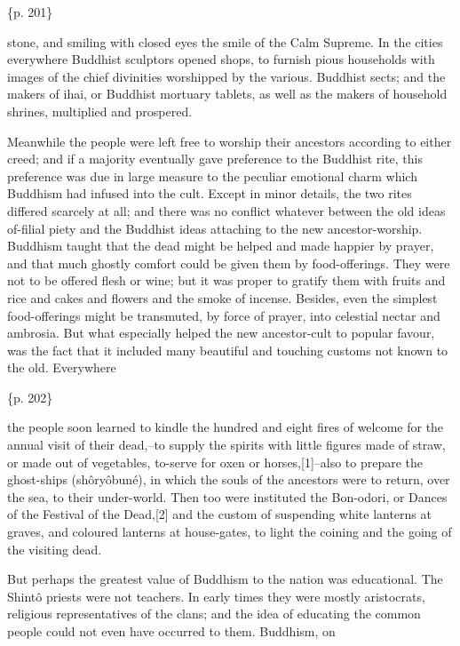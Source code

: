 \{p. 201\}

stone, and smiling with closed eyes the smile of the Calm Supreme. In the cities everywhere Buddhist sculptors opened shops, to furnish pious households with images of the chief divinities worshipped by the various. Buddhist sects; and the makers of ihai, or Buddhist mortuary tablets, as well as the makers of household shrines, multiplied and prospered.



Meanwhile the people were left free to worship their ancestors according to either creed; and if a majority eventually gave preference to the Buddhist rite, this preference was due in large measure to the peculiar emotional charm which Buddhism had infused into the cult. Except in minor details, the two rites differed scarcely at all; and there was no conflict whatever between the old ideas of-filial piety and the Buddhist ideas attaching to the new ancestor-worship. Buddhism taught that the dead might be helped and made happier by prayer, and that much ghostly comfort could be given them by food-offerings. They were not to be offered flesh or wine; but it was proper to gratify them with fruits and rice and cakes and flowers and the smoke of incense. Besides, even the simplest food-offerings might be transmuted, by force of prayer, into celestial nectar and ambrosia. But what especially helped the new ancestor-cult to popular favour, was the fact that it included many beautiful and touching customs not known to the old. Everywhere

\{p. 202\}

the people soon learned to kindle the hundred and eight fires of welcome for the annual visit of their dead,--to supply the spirits with little figures made of straw, or made out of vegetables, to-serve for oxen or horses,[1]--also to prepare the ghost-ships (shôryôbuné), in which the souls of the ancestors were to return, over the sea, to their under-world. Then too were instituted the Bon-odori, or Dances of the Festival of the Dead,[2] and the custom of suspending white lanterns at graves, and coloured lanterns at house-gates, to light the coining and the going of the visiting dead.



But perhaps the greatest value of Buddhism to the nation was educational. The Shintô priests were not teachers. In early times they were mostly aristocrats, religious representatives of the clans; and the idea of educating the common people could not even have occurred to them. Buddhism, on

